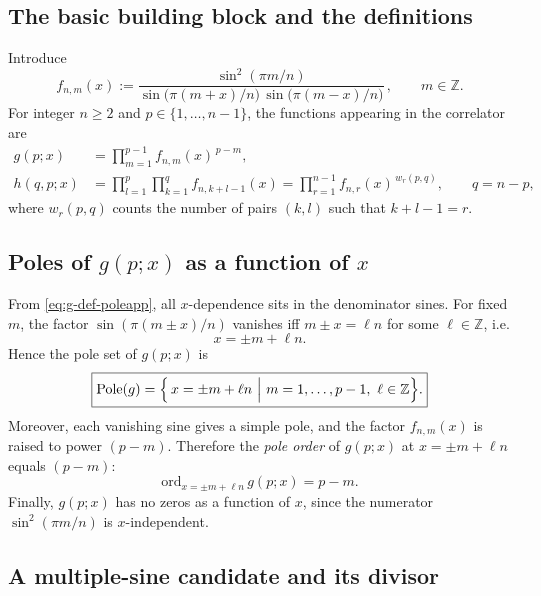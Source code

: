 \documentclass[11pt]{article}
\begin{document}
{  \subsection*{The basic building block and the definitions}

  Introduce
  \begin{equation}
    f_{n,m}(x) :=\frac{\sin^{2}(\pi m/n)}{\sin\!\bigl(\pi(m+x)/n\bigr)\,\sin\!\bigl(\pi(m-x)/n\bigr)}
    \,, \qquad m\in\mathbb{Z}.
  \end{equation}
  For integer $n\ge 2$ and $p\in\{1,\dots,n-1\}$, the functions appearing in the
  correlator are
  \begin{align}
    g(p;x)   & =\prod_{m=1}^{p-1}f_{n,m}(x)^{\,p-m}, \label{eq:g-def-poleapp}                                                                  \\[2pt]
    h(q,p;x) & =\prod_{l=1}^{p}\prod_{k=1}^{q}f_{n,k+l-1}(x) =\prod_{r=1}^{n-1}f_{n,r}(x)^{\,w_r(p,q)}, \qquad q=n-p, \label{eq:h-def-poleapp}
  \end{align}
  where $w_{r}(p,q)$ counts the number of pairs $(k,l)$ such that $k+l-1=r$.

  \subsection*{Poles of $g(p;x)$ as a function of $x$}

  From \eqref{eq:g-def-poleapp}, all $x$-dependence sits in the denominator
  sines. For fixed $m$, the factor $\sin(\pi(m\pm x)/n)$ vanishes iff
  $m\pm x=\ell n$ for some $\ell\in\mathbb{Z}$, i.e.
  \begin{equation}
    x=\pm m+\ell n.
  \end{equation}
  Hence the pole set of $g(p;x)$ is
  \begin{equation}
    \boxed{ \mathrm{Pole}(g)=\Bigl\{\,x=\pm m+\ell n\ \Big|\ m=1,\dots,p-1,\ \ell\in\mathbb{Z}\Bigr\}. }
  \end{equation}
  Moreover, each vanishing sine gives a simple pole, and the factor $f_{n,m}(x)$
  is raised to power $(p-m)$. Therefore the \emph{pole order} of $g(p;x)$ at
  $x=\pm m+\ell n$ equals $(p-m)$:
  \begin{equation}
    \boxed{ \mathrm{ord}_{x=\pm m+\ell n}\, g(p;x)=p-m. }
  \end{equation}
  Finally, $g(p;x)$ has no zeros as a function of $x$, since the numerator $\sin^{2}
  (\pi m/n)$ is $x$-independent.

  \subsection*{A multiple-sine candidate and its divisor}

}
\end{document}
